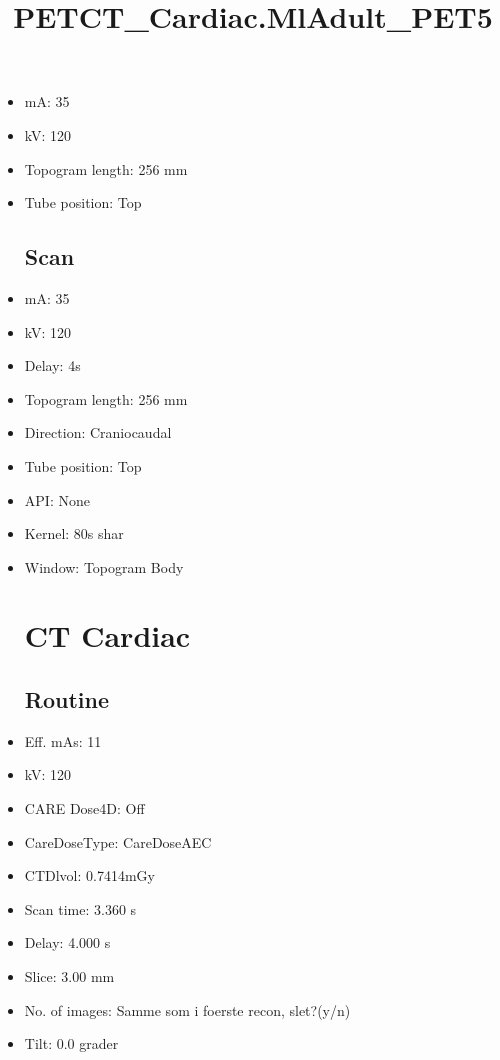 \documentclass[12pt]{article}
\title{PETCT\_Cardiac.MlAdult\_PET5}
\begin{document}
\maketitle
\newpage
\tableofcontents
\newpage
{}


\begin{itemize}[noitemsep]\section{Topogram}
\subsection{Routine}
\item mA: 35\item kV: 120\item Topogram length: 256 mm\item Tube position: Top
\subsection{Scan}\item mA: 35\item kV: 120\item Delay: 4s\item Topogram length: 256 mm\item Direction: Craniocaudal\item Tube position: Top\item API: None\item Kernel: 80s shar\item Window: Topogram Body
\section{CT Cardiac}
\subsection{Routine}
\item Eff. mAs: 11\item kV: 120\item CARE Dose4D: Off\item CareDoseType: CareDoseAEC\item CTDlvol: 0.7414mGy\item Scan time: 3.360 s\item Delay: 4.000 s\item Slice: 3.00 mm\item No. of images: Samme som i foerste recon, slet?(y/n)\item Tilt: 0.0 grader

\end{itemize}
\end{document}
